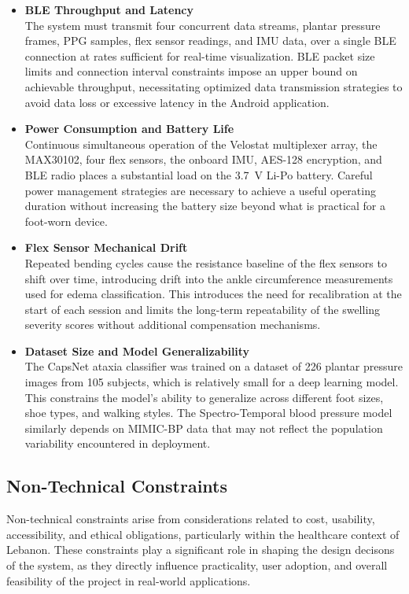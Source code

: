 \begin{itemize}
    \item \textbf{BLE Throughput and Latency}\\
    The system must transmit four concurrent data streams, plantar pressure frames, PPG samples, flex sensor readings, and IMU data, over a single BLE connection at rates sufficient for real-time visualization. BLE packet size limits and connection interval constraints impose an upper bound on achievable throughput, necessitating optimized data transmission strategies to avoid data loss or excessive latency in the Android application.
    \item \textbf{Power Consumption and Battery Life}\\
    Continuous simultaneous operation of the Velostat multiplexer array, the MAX30102, four flex sensors, the onboard IMU, AES-128 encryption, and BLE radio places a substantial load on the 3.7~V Li-Po battery. Careful power management strategies are necessary to achieve a useful operating duration without increasing the battery size beyond what is practical for a foot-worn device.
    \item \textbf{Flex Sensor Mechanical Drift}\\
    Repeated bending cycles cause the resistance baseline of the flex sensors to shift over time, introducing drift into the ankle circumference measurements used for edema classification. This introduces the need for recalibration at the start of each session and limits the long-term repeatability of the swelling severity scores without additional compensation mechanisms.
    \item \textbf{Dataset Size and Model Generalizability}\\
    The CapsNet ataxia classifier was trained on a dataset of 226 plantar pressure images from 105 subjects, which is relatively small for a deep learning model. This constrains the model's ability to generalize across different foot sizes, shoe types, and walking styles. The Spectro-Temporal blood pressure model similarly depends on MIMIC-BP data that may not reflect the population variability encountered in deployment.
\end{itemize}

\subsection{Non-Technical Constraints}
Non-technical constraints arise from considerations related to cost, usability, accessibility, and ethical obligations, particularly within the healthcare context of Lebanon. These constraints play a significant role in shaping the design decisons of the system, as they directly influence practicality, user adoption, and overall feasibility of the project in real-world applications.

